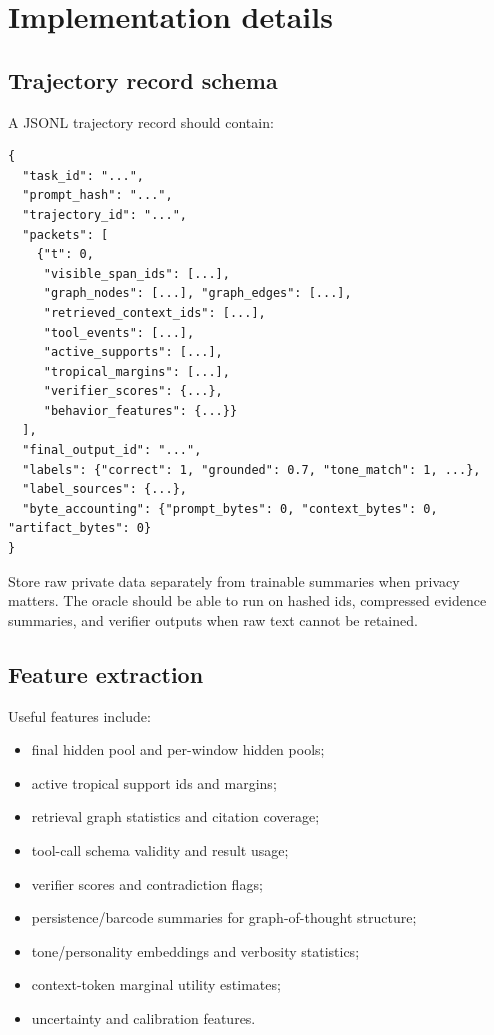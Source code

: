\documentclass[11pt]{article}
\theoremstyle{definition}
\theoremstyle{remark}
\numberwithin{equation}{section}
\begin{document}
\section{Implementation details}

\subsection{Trajectory record schema}

A JSONL trajectory record should contain:
\begin{Verbatim}[fontsize=\small,frame=single]
{
  "task_id": "...",
  "prompt_hash": "...",
  "trajectory_id": "...",
  "packets": [
    {"t": 0,
     "visible_span_ids": [...],
     "graph_nodes": [...], "graph_edges": [...],
     "retrieved_context_ids": [...],
     "tool_events": [...],
     "active_supports": [...],
     "tropical_margins": [...],
     "verifier_scores": {...},
     "behavior_features": {...}}
  ],
  "final_output_id": "...",
  "labels": {"correct": 1, "grounded": 0.7, "tone_match": 1, ...},
  "label_sources": {...},
  "byte_accounting": {"prompt_bytes": 0, "context_bytes": 0, "artifact_bytes": 0}
}
\end{Verbatim}

Store raw private data separately from trainable summaries when privacy matters.  The oracle should be able to run on hashed ids, compressed evidence summaries, and verifier outputs when raw text cannot be retained.

\subsection{Feature extraction}

Useful features include:
\begin{itemize}
    \item final hidden pool and per-window hidden pools;
    \item active tropical support ids and margins;
    \item retrieval graph statistics and citation coverage;
    \item tool-call schema validity and result usage;
    \item verifier scores and contradiction flags;
    \item persistence/barcode summaries for graph-of-thought structure;
    \item tone/personality embeddings and verbosity statistics;
    \item context-token marginal utility estimates;
    \item uncertainty and calibration features.
\end{itemize}
\end{document}
